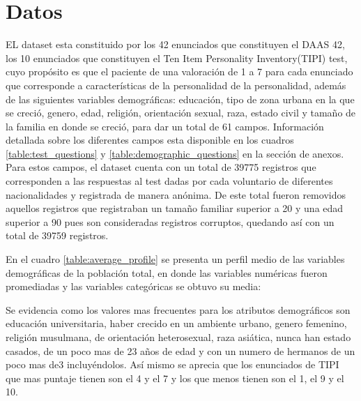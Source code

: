 \section{Datos}

EL dataset esta constituido por los 42 enunciados que constituyen el DAAS 42, los 10 enunciados que constituyen el Ten Item Personality Inventory(TIPI) test\cite{gosling2003very}, cuyo propósito es que el paciente de una valoración de 1 a 7 para cada enunciado que corresponde a características de la personalidad de la personalidad, además de las siguientes variables demográficas: educación, tipo de zona urbana en la que se creció, genero, edad, religión, orientación sexual, raza, estado civil y tamaño de la familia en donde se creció, para dar un total de 61 campos. Información detallada sobre los diferentes campos esta disponible en los cuadros \ref{table:test_questions} y  \ref{table:demographic_questions} en la sección de anexos. Para estos campos, el dataset cuenta con un total de 39775 registros que corresponden a las respuestas al test dadas por cada voluntario de diferentes nacionalidades y registrada de manera anónima. De este total fueron removidos aquellos registros que registraban un tamaño familiar superior a 20 y una edad superior a 90 pues son consideradas registros corruptos, quedando así con un total de 39759 registros.
 \medbreak
 
 En el cuadro \ref{table:average_profile} se presenta un perfil medio de las variables demográficas de la población total, en donde las variables numéricas fueron promediadas y las variables categóricas se obtuvo su media:
 \medbreak
 
 \begin{table}[ht]
\centering
\caption{Perfil medio dentro de cada diagnostico para la población general}
\label{table:average_profile}
\end{table}%

Se evidencia como los valores mas frecuentes para los atributos demográficos son educación universitaria, haber crecido en un ambiente urbano, genero femenino, religión musulmana, de orientación heterosexual, raza asiática, nunca han estado casados, de un poco mas de 23 años de edad y con un numero de hermanos de un poco mas de3 incluyéndolos. Así mismo se aprecia que los enunciados de TIPI que mas puntaje tienen son el 4 y el 7 y los que menos tienen son el 1, el 9 y el 10.
 \medbreak

